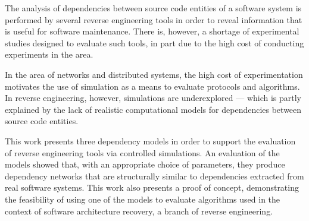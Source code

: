 
The analysis of dependencies between source code entities of a software system is performed by several reverse engineering tools in order to reveal information that is useful for software maintenance. There is, however, a shortage of experimental studies designed to evaluate such tools, in part due to the high cost of conducting experiments in the area.

In the area of networks and distributed systems, the high cost of experimentation motivates the use of simulation as a means to evaluate protocols and algorithms. In reverse engineering, however, simulations are underexplored --- which is partly explained by the lack of realistic computational models for dependencies between source code entities.

This work presents three dependency models in order to support the evaluation of reverse engineering tools via controlled simulations. An evaluation of the models showed that, with an appropriate choice of parameters, they produce dependency networks that are structurally similar to dependencies extracted from real software systems. This work also presents a proof of concept, demonstrating the feasibility of using one of the models to evaluate algorithms used in the context of software architecture recovery, a branch of reverse engineering.